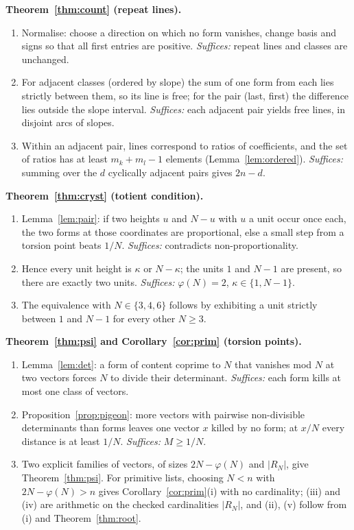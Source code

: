 \documentclass[11pt]{amsart}
\theoremstyle{definition}
\theoremstyle{remark}
\begin{document}
\noindent\textbf{Theorem~\ref{thm:count} (repeat lines).}
\begin{enumerate}[leftmargin=2em,label=(C\arabic*)]
\item Normalise: choose a direction on which no form vanishes, change basis and signs so that all first entries are positive. \emph{Suffices:} repeat lines and classes are unchanged.
\item For adjacent classes (ordered by slope) the sum of one form from each lies strictly between them, so its line is free; for the pair (last, first) the difference lies outside the slope interval. \emph{Suffices:} each adjacent pair yields free lines, in disjoint arcs of slopes.
\item Within an adjacent pair, lines correspond to ratios of coefficients, and the set of ratios has at least $m_k+m_l-1$ elements (Lemma~\ref{lem:ordered}). \emph{Suffices:} summing over the $d$ cyclically adjacent pairs gives $2n-d$.
\end{enumerate}

\noindent\textbf{Theorem~\ref{thm:cryst} (totient condition).}
\begin{enumerate}[leftmargin=2em,label=(T\arabic*)]
\item Lemma~\ref{lem:pair}: if two heights $u$ and $N-u$ with $u$ a unit occur once each, the two forms at those coordinates are proportional, else a small step from a torsion point beats $1/N$. \emph{Suffices:} contradicts non-proportionality.
\item Hence every unit height is $\kappa$ or $N-\kappa$; the units $1$ and $N-1$ are present, so there are exactly two units. \emph{Suffices:} $\varphi(N)=2$, $\kappa\in\{1,N-1\}$.
\item The equivalence with $N\in\{3,4,6\}$ follows by exhibiting a unit strictly between $1$ and $N-1$ for every other $N\ge3$.
\end{enumerate}

\noindent\textbf{Theorem~\ref{thm:psi} and Corollary~\ref{cor:prim} (torsion points).}
\begin{enumerate}[leftmargin=2em,label=(P\arabic*)]
\item Lemma~\ref{lem:det}: a form of content coprime to $N$ that vanishes mod $N$ at two vectors forces $N$ to divide their determinant. \emph{Suffices:} each form kills at most one class of vectors.
\item Proposition~\ref{prop:pigeon}: more vectors with pairwise non-divisible determinants than forms leaves one vector $x$ killed by no form; at $x/N$ every distance is at least $1/N$. \emph{Suffices:} $M\ge1/N$.
\item Two explicit families of vectors, of sizes $2N-\varphi(N)$ and $|R_N|$, give Theorem~\ref{thm:psi}. For primitive lists, choosing $N<n$ with $2N-\varphi(N)>n$ gives Corollary~\ref{cor:prim}(i) with no cardinality; (iii) and (iv) are arithmetic on the checked cardinalities $|R_N|$, and (ii), (v) follow from (i) and Theorem~\ref{thm:root}.
\end{enumerate}
\end{document}
